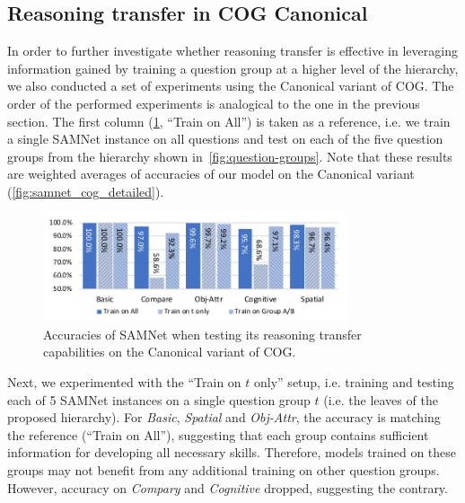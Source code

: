 \subsection{Reasoning transfer in COG Canonical}
\label{sec:reasoning-transfer-cog}
In order to further investigate whether reasoning transfer is effective in leveraging information gained by training a question group at a higher level of the hierarchy, we also conducted a set of experiments using the Canonical variant of COG.
The order of the performed experiments is analogical to the one in the previous section.
The first column (\cref{fig:cog_reasoning_transfer}, ``Train on All'') is taken as a reference, i.e.
we train a single SAMNet instance on all questions and test on each of the five question groups from the hierarchy shown in~\cref{fig:question-groups}.
Note that these results are weighted averages of accuracies of our model on the Canonical variant (\cref{fig:samnet_cog_detailed}).

\begin{figure}[htbp]
	\centering
	\includegraphics[width=0.8\textwidth]{../img/plots/cog_reasoning_transfer.pdf}
	\caption{Accuracies of SAMNet when testing its reasoning transfer capabilities on the Canonical variant of COG.}
	\label{fig:cog_reasoning_transfer}
\end{figure}

Next, we experimented with the ``Train on $t$ only'' setup, i.e. training and testing each of 5 SAMNet instances on a single question group $t$ (i.e. the leaves of the proposed hierarchy).
For \textit{Basic}, \textit{Spatial} and \textit{Obj-Attr}, the accuracy is matching the reference (``Train on All''), suggesting that each group contains sufficient information for developing all necessary skills.
Therefore, models trained on these groups may not benefit from any additional training on other question groups.
However, accuracy on \textit{Compary} and \textit{Cognitive} dropped, suggesting the contrary.

